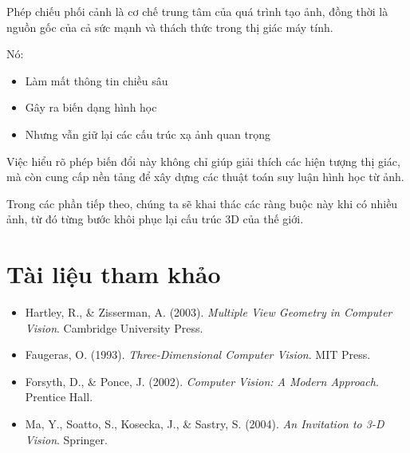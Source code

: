 Phép chiếu phối cảnh là cơ chế trung tâm của quá trình tạo ảnh, đồng thời là nguồn gốc của cả sức mạnh và thách thức trong thị giác máy tính.

Nó:
\begin{itemize}
	\item Làm mất thông tin chiều sâu
	\item Gây ra biến dạng hình học
	\item Nhưng vẫn giữ lại các cấu trúc xạ ảnh quan trọng
\end{itemize}

Việc hiểu rõ phép biến đổi này không chỉ giúp giải thích các hiện tượng thị giác, mà còn cung cấp nền tảng để xây dựng các thuật toán suy luận hình học từ ảnh.

Trong các phần tiếp theo, chúng ta sẽ khai thác các ràng buộc này khi có nhiều ảnh, từ đó từng bước khôi phục lại cấu trúc 3D của thế giới.

\section*{Tài liệu tham khảo}
\begin{itemize}
	\item[1] Hartley, R., \& Zisserman, A. (2003). \textit{Multiple View Geometry in Computer Vision}. Cambridge University Press.
	\item[2] Faugeras, O. (1993). \textit{Three-Dimensional Computer Vision}. MIT Press.
	\item[3] Forsyth, D., \& Ponce, J. (2002). \textit{Computer Vision: A Modern Approach}. Prentice Hall.
	\item[4] Ma, Y., Soatto, S., Kosecka, J., \& Sastry, S. (2004). \textit{An Invitation to 3-D Vision}. Springer.
\end{itemize}